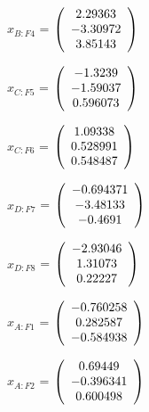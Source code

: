 \begin{description}
$x_{B:F4}$ = $\left( \begin{array} {ccc}    2.29363 \\   -3.30972 \\    3.85143
\end{array} \right)\\ \\$

$x_{C:F5}$ = $\left( \begin{array} {ccc}    -1.3239 \\   -1.59037 \\   0.596073
\end{array} \right)\\ \\$

$x_{C:F6}$ = $\left( \begin{array} {ccc}    1.09338 \\   0.528991 \\   0.548487
\end{array} \right)\\ \\$

$x_{D:F7}$ = $\left( \begin{array} {ccc}  -0.694371 \\   -3.48133 \\    -0.4691
\end{array} \right)\\ \\$

$x_{D:F8}$ = $\left( \begin{array} {ccc}   -2.93046 \\    1.31073 \\    0.22227
\end{array} \right)\\ \\$

$\hat{x}_{A:F1}$ = $\left( \begin{array} {ccc}  -0.760258 \\   0.282587 \\  -0.584938
\end{array} \right)\\ \\$

$\hat{x}_{A:F2}$ = $\left( \begin{array} {ccc}    0.69449 \\  -0.396341 \\   0.600498
\end{array} \right)\\ \\$


\end{description}
